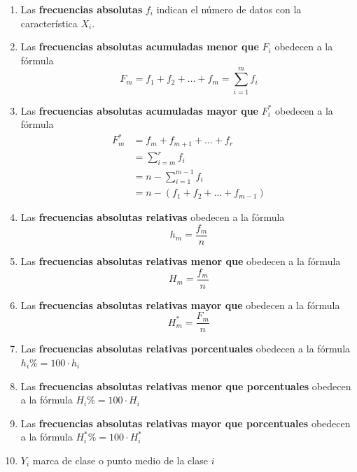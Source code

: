 \documentclass[
  11pt,
]{krantz}
\theoremstyle{definition}
\theoremstyle{definition}
\theoremstyle{definition}
\theoremstyle{definition}
\theoremstyle{remark}
\begin{document}
\begin{enumerate}
\def\labelenumi{\arabic{enumi}.}
\item
  Las \textbf{frecuencias absolutas} \(f_i\) indican el número de datos con la característica \(X_i\).
\item
  Las \textbf{frecuencias absolutas acumuladas menor que} \(F_i\) obedecen a la fórmula \[F_m=f_1+f_2+\ldots+f_m=\sum_{i=1}^mf_i\]
\item
  Las \textbf{frecuencias absolutas acumuladas mayor que} \(F_i^*\) obedecen a la fórmula \[
  \begin{aligned}
  F_m^*&=f_m+f_{m+1}+\ldots+f_r\\
  &=\sum_{i=m}^rf_i\\
  &=n-\sum_{i=1}^{m-1}f_i\\
  &=n-\left(f_1+f_{2}+\ldots+f_{m-1}\right)
  \end{aligned}
  \]
\item
  Las \textbf{frecuencias absolutas relativas} obedecen a la fórmula \[h_m=\frac{f_m}{n}\]
\item
  Las \textbf{frecuencias absolutas relativas menor que} obedecen a la fórmula \[H_m=\frac{f_m}{n}\]
\item
  Las \textbf{frecuencias absolutas relativas mayor que} obedecen a la fórmula \[H_m^*=\frac{F_m}{n}\]
\item
  Las \textbf{frecuencias absolutas relativas porcentuales} obedecen a la fórmula \(h_i\%=100\cdot h_i\)
\item
  Las \textbf{frecuencias absolutas relativas menor que porcentuales} obedecen a la fórmula \(H_i\%=100\cdot H_i\)
\item
  Las \textbf{frecuencias absolutas relativas mayor que porcentuales} obedecen a la fórmula \(H_i^*\%=100\cdot H_i^*\)
\item
  \(Y_i\) marca de clase o punto medio de la clase \(i\)
\end{enumerate}
\end{document}
